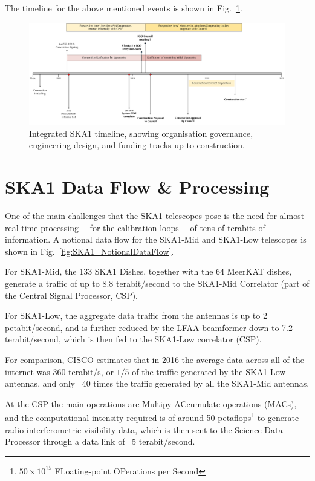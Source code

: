 \documentclass[a4paper,
               biblatex,       %
               keeplastbox,    %
               ]{jacow-2_1}    %
\begin{document}
The timeline for the above mentioned events is shown in Fig.~\ref{fig:IntegratedTimeline_v5}.
 
\label{sec:ska1_timeline}
 \begin{figure}[!tb]
   \centering
     \includegraphics[width=\textwidth]{FRAPL01f5}
   \caption{Integrated SKA1 timeline, showing organisation governance, engineering design, and funding tracks up to construction.}
   \label{fig:IntegratedTimeline_v5}
 \end{figure}
 


\section{SKA1 Data Flow \& Processing} %
\label{sec:ska1_data_flow_and_processing}

One of the main challenges that the SKA1 telescopes pose is the need for almost real-time processing —for the calibration loops— of tens of terabits of information. A notional data flow for the SKA1-Mid and SKA1-Low telescopes is shown in Fig.~\ref{fig:SKA1_NotionalDataFlow}.

For SKA1-Mid, the 133 SKA1 Dishes, together with the 64 MeerKAT dishes, generate a traffic of up to 8.8 terabit/second to the SKA1-Mid Correlator (part of the Central Signal Processor, CSP).

For SKA1-Low, the aggregate data traffic from the antennas is up to 2 petabit/second, and is further reduced by the LFAA beamformer down to 7.2 terabit/second, which is then fed to the SKA1-Low correlator (CSP).

For comparison, CISCO estimates that in 2016 the average data across all of the internet was 360 terabit/s, or $1/5$ of the traffic generated by the SKA1-Low antennas, and only ~40 times the traffic generated by all the SKA1-Mid antennas.

At the CSP the main operations are Multipy-ACcumulate operations (MACs), and the computational intensity required is of around 50 petaflops\footnote{$50 \times 10^{15}$ FLoating-point OPerations per Second} to generate radio interferometric visibility data, which is then sent to the Science Data Processor through a data link of ~5 terabit/second.
\end{document}
